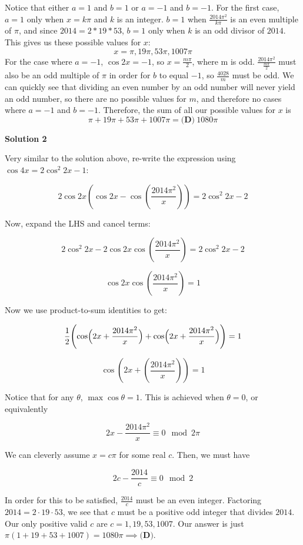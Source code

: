 \begin{enumerate}
 Notice that either $a = 1$ and $b = 1$ or $a = -1$ and $b = -1$.  For the first case, $a = 1$ only when $x = k\pi$ and $k$ is an integer.  $b = 1$ when $\frac{2014\pi^2}{k\pi}$ is an even multiple of $\pi$, and since $2014 = 2*19*53$, $b =1$ only when $k$ is an odd divisor of $2014$.  This gives us these possible values for $x$:
 \[x= \pi, 19\pi, 53\pi, 1007\pi\]For the case where $a = -1$, $\cos{2x} = -1$, so $x = \frac{m\pi}{2}$, where m is odd.  $\frac{2014\pi^2}{\frac{m\pi}{2}}$ must also be an odd multiple of $\pi$ in order for $b$ to equal $-1$, so $\frac{4028}{m}$ must be odd.  We can quickly see that dividing an even number by an odd number will never yield an odd number, so there are no possible values for $m$, and therefore no cases where $a = -1$ and $b = -1$. Therefore, the sum of all our possible values for $x$ is
 \[\pi + 19\pi + 53\pi + 1007\pi = \boxed{\textbf{(D)}\ 1080 \pi}\]




\textbf{Solution 2}

Very similar to the solution above, re-write the expression using $\cos 4x = 2 \cos^2 2x - 1$:

 
 \[2\cos2x \left(\cos2x - \cos{\left( \frac{2014\pi^2}{x} \right) } \right) = 2 \cos^2 2x - 2\]

 Now, expand the LHS and cancel terms:

 
 \[2 \cos^2 2x - 2 \cos 2x \cos{\left( \frac{2014\pi^2}{x} \right) } = 2 \cos^2 2x - 2\]

 \[\cos 2x \cos{\left( \frac{2014\pi^2}{x} \right) } = 1\]

 Now we use product-to-sum identities to get:

 
 \[\frac{1}{2} \Biggl( \cos\Bigl( 2x + \frac{2014 \pi^2}{x} \Bigr) + \cos\Bigl( 2x + \frac{2014 \pi^2}{x} \Bigr) \Biggr) = 1\]

 \[\cos{\left(2x + \left( \frac{2014\pi^2}{x} \right) \right)} = 1\]

 Notice that for any $\theta$, $\max{\cos \theta} = 1$. This is achieved when $\theta = 0$, or equivalently 

 
 \[2x - \frac{2014\pi^2}{x} \equiv 0 \mod 2\pi\]

 We can cleverly assume $x=c\pi$ for some real $c$. Then, we must have

 
 \[2c - \frac{2014}{c} \equiv 0 \mod 2\]

 In order for this to be satisfied, $\frac{2014}{c}$ must be an even integer. Factoring $2014 = 2 \cdot 19 \cdot 53$, we see that $c$ must be a positive odd integer that divides $2014$. Our only positive valid $c$ are $c = 1, 19, 53, 1007$. Our answer is just $\pi(1+19+53+1007) = 1080\pi \implies \textbf{(D)}$. 


\end{enumerate}
